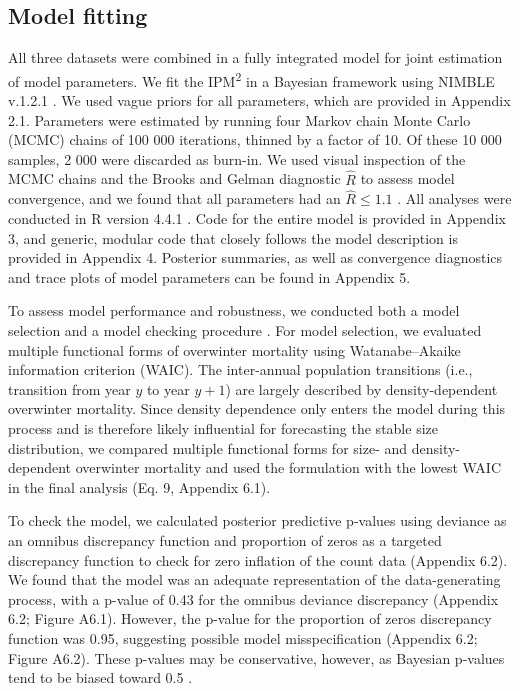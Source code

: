 \documentclass{article}
\begin{document}
\subsection{Model fitting}
All three datasets were combined in a fully integrated model for joint estimation of model parameters. We fit the IPM\textsuperscript{2} in a Bayesian framework using NIMBLE v.1.2.1 \parencite{de2017programming}. We used vague priors for all parameters, which are provided in Appendix 2.1. Parameters were estimated by running four Markov chain Monte Carlo (MCMC) chains of 100 000 iterations, thinned by a factor of 10. Of these 10 000 samples, 2 000 were discarded as burn-in. We used visual inspection of the MCMC chains and the Brooks and Gelman diagnostic $\hat{R}$ to assess model convergence, and we found that all parameters had an $\hat{R} \leq 1.1$ \parencite{brooks1998general}. All analyses were conducted in R version 4.4.1 \parencite{Rcore}. Code for the entire model is provided in Appendix 3, and generic, modular code that closely follows the model description is provided in Appendix 4. Posterior summaries, as well as convergence diagnostics and trace plots of model parameters can be found in Appendix 5. 

To assess model performance and robustness, we conducted both a model selection and a model checking procedure \parencite{conn2018guide}. For model selection, we evaluated multiple functional forms of overwinter mortality using Watanabe–Akaike information criterion (WAIC). The inter-annual population transitions (i.e., transition from year $y$ to year $y + 1$) are largely described by density-dependent overwinter mortality. Since density dependence only enters the model during this process and is therefore likely influential for forecasting the stable size distribution, we compared multiple functional forms for size- and density-dependent overwinter mortality and used the formulation with the lowest WAIC in the final analysis (Eq. 9, Appendix 6.1).

To check the model, we calculated posterior predictive p-values using deviance as an omnibus discrepancy function and proportion of zeros as a targeted discrepancy function to check for zero inflation of the count data (Appendix 6.2). We found that the model was an adequate representation of the data-generating process, with a p-value of 0.43 for the omnibus deviance discrepancy (Appendix 6.2; Figure A6.1). However, the p-value for the proportion of zeros discrepancy function was 0.95, suggesting possible model misspecification (Appendix 6.2; Figure A6.2). These p-values may be conservative, however, as Bayesian p-values tend to be biased toward 0.5 \parencite{conn2018guide}.
\end{document}
